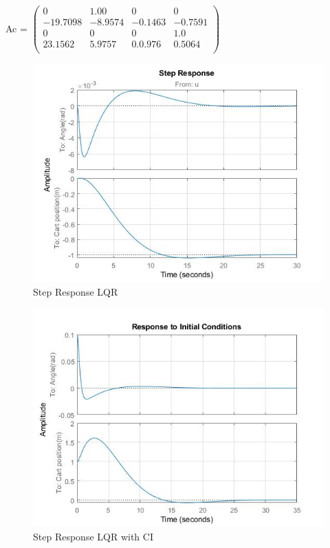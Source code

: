 \documentclass[a4paper]{article}
\begin{document}
\newline
Ac = $\begin{pmatrix}
     0 & 1.00 & 0 &  0\\
     -19.7098 & -8.9574 & -0.1463 & -0.7591\\
     0 & 0 & 0 & 1.0\\
     23.1562 & 5.9757 & 0.0.976 & 0.5064\\
\end{pmatrix}$
\newline
\newline
\begin{figure}[!htb]
    \centering
    \includegraphics[scale = 0.6]{StepResponse_LQR.jpg}
    \caption{Step Response LQR}
\end{figure}
\newpage
\begin{figure}[!htb]
    \centering
    \includegraphics[scale = 0.6]{StepResponseCI_LQR.jpg}
    \caption{Step Response LQR with CI}
\end{figure}
\end{document}
